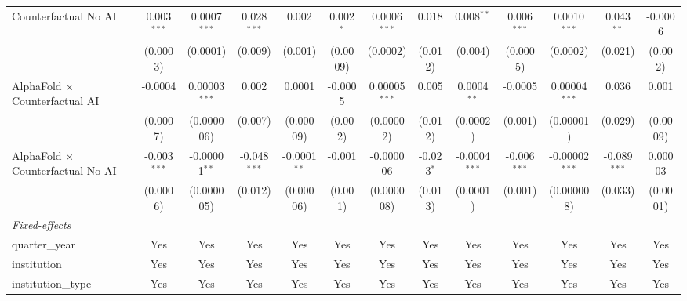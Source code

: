 \begin{tabular}{lcccccccccccc}
   Counterfactual No AI                     & 0.003$^{***}$  & 0.0007$^{***}$  & 0.028$^{***}$  & 0.002          & 0.002$^{*}$    & 0.0006$^{***}$  & 0.018        & 0.008$^{**}$    & 0.006$^{***}$  & 0.0010$^{***}$   & 0.043$^{**}$   & -0.0006\\   
                                            & (0.0003)       & (0.0001)        & (0.009)        & (0.001)        & (0.0009)       & (0.0002)        & (0.012)      & (0.004)         & (0.0005)       & (0.0002)         & (0.021)        & (0.002)\\   
   AlphaFold $\times$ Counterfactual AI     & -0.0004        & 0.00003$^{***}$ & 0.002          & 0.0001         & -0.0005        & 0.00005$^{***}$ & 0.005        & 0.0004$^{**}$   & -0.0005        & 0.00004$^{***}$  & 0.036          & 0.001\\   
                                            & (0.0007)       & (0.000006)      & (0.007)        & (0.00009)      & (0.002)        & (0.00002)       & (0.012)      & (0.0002)        & (0.001)        & (0.00001)        & (0.029)        & (0.0009)\\   
   AlphaFold $\times$ Counterfactual No AI  & -0.003$^{***}$ & -0.00001$^{**}$ & -0.048$^{***}$ & -0.0001$^{**}$ & -0.001         & -0.000006       & -0.023$^{*}$ & -0.0004$^{***}$ & -0.006$^{***}$ & -0.00002$^{***}$ & -0.089$^{***}$ & 0.00003\\   
                                            & (0.0006)       & (0.000005)      & (0.012)        & (0.00006)      & (0.001)        & (0.000008)      & (0.013)      & (0.0001)        & (0.001)        & (0.000008)       & (0.033)        & (0.0001)\\   
   \midrule
   \emph{Fixed-effects}\\
   quarter\_year                            & Yes            & Yes             & Yes            & Yes            & Yes            & Yes             & Yes          & Yes             & Yes            & Yes              & Yes            & Yes\\  
   institution                              & Yes            & Yes             & Yes            & Yes            & Yes            & Yes             & Yes          & Yes             & Yes            & Yes              & Yes            & Yes\\  
   institution\_type                        & Yes            & Yes             & Yes            & Yes            & Yes            & Yes             & Yes          & Yes             & Yes            & Yes              & Yes            & Yes\\  

\end{tabular}
